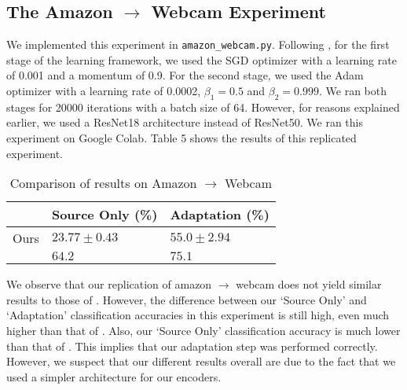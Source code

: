 \documentclass[14pt]{extarticle}
\begin{document}
		\subsection{The Amazon $\rightarrow$ Webcam Experiment}
		We implemented this experiment in \texttt{amazon\_webcam.py}. Following \cite{adda}, for the first stage of the learning framework, we used the SGD optimizer with a learning rate of 0.001 and a momentum of 0.9. For the second stage, we used the Adam optimizer with a learning rate of 0.0002, $\beta_1 = 0.5$ and $\beta_2 = 0.999$. We ran both stages for 20000 iterations with a batch size of 64. However, for reasons explained earlier, we used a ResNet18 architecture instead of ResNet50. We ran this experiment on Google Colab. Table 5 shows the results of this replicated experiment.
		\begin{table}[H]
			\centering
			\begin{tabular}{|P{40mm}|P{40mm}|P{40mm}|}
				\hline
				 & Source Only (\%) & Adaptation (\%)\\
				\hline
				Ours & $23.77 \pm 0.43$ & $55.0 \pm 2.94$\\
				\hline
				\cite{adda} & $64.2$ & $75.1$\\
				\hline
			\end{tabular}
			\caption{Comparison of results on Amazon $\rightarrow$ Webcam}
		\end{table}
		We observe that our replication of amazon $\rightarrow$ webcam does not yield similar results to those of \cite{adda}. However, the difference between our `Source Only' and `Adaptation' classification accuracies in this experiment is still high, even much higher than that of \cite{adda}. Also, our `Source Only' classification accuracy is much lower than that of \cite{adda}. This implies that our adaptation step was performed correctly. However, we suspect that our different results overall are due to the fact that we used a simpler architecture for our encoders.
\end{document}
